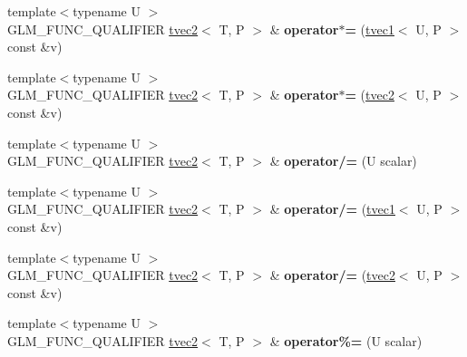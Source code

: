 \begin{DoxyCompactItemize}
\item 
\hypertarget{structglm_1_1tvec2_aacddba2473d9bb1871b30b33dd214bec}{{\footnotesize template$<$typename U $>$ }\\G\-L\-M\-\_\-\-F\-U\-N\-C\-\_\-\-Q\-U\-A\-L\-I\-F\-I\-E\-R \hyperlink{structglm_1_1tvec2}{tvec2}$<$ T, P $>$ \& {\bfseries operator$\ast$=} (\hyperlink{structglm_1_1tvec1}{tvec1}$<$ U, P $>$ const \&v)}\label{structglm_1_1tvec2_aacddba2473d9bb1871b30b33dd214bec}

\item 
\hypertarget{structglm_1_1tvec2_a993842ad4e15e45284bd39b7ceaa7dd3}{{\footnotesize template$<$typename U $>$ }\\G\-L\-M\-\_\-\-F\-U\-N\-C\-\_\-\-Q\-U\-A\-L\-I\-F\-I\-E\-R \hyperlink{structglm_1_1tvec2}{tvec2}$<$ T, P $>$ \& {\bfseries operator$\ast$=} (\hyperlink{structglm_1_1tvec2}{tvec2}$<$ U, P $>$ const \&v)}\label{structglm_1_1tvec2_a993842ad4e15e45284bd39b7ceaa7dd3}

\item 
\hypertarget{structglm_1_1tvec2_a50542837f7d732334ecf178403a4100b}{{\footnotesize template$<$typename U $>$ }\\G\-L\-M\-\_\-\-F\-U\-N\-C\-\_\-\-Q\-U\-A\-L\-I\-F\-I\-E\-R \hyperlink{structglm_1_1tvec2}{tvec2}$<$ T, P $>$ \& {\bfseries operator/=} (U scalar)}\label{structglm_1_1tvec2_a50542837f7d732334ecf178403a4100b}

\item 
\hypertarget{structglm_1_1tvec2_a19b74b0db17121ccf51b68fc25e579a2}{{\footnotesize template$<$typename U $>$ }\\G\-L\-M\-\_\-\-F\-U\-N\-C\-\_\-\-Q\-U\-A\-L\-I\-F\-I\-E\-R \hyperlink{structglm_1_1tvec2}{tvec2}$<$ T, P $>$ \& {\bfseries operator/=} (\hyperlink{structglm_1_1tvec1}{tvec1}$<$ U, P $>$ const \&v)}\label{structglm_1_1tvec2_a19b74b0db17121ccf51b68fc25e579a2}

\item 
\hypertarget{structglm_1_1tvec2_a572fa5d63392fd44f7bbdd35cbed43ca}{{\footnotesize template$<$typename U $>$ }\\G\-L\-M\-\_\-\-F\-U\-N\-C\-\_\-\-Q\-U\-A\-L\-I\-F\-I\-E\-R \hyperlink{structglm_1_1tvec2}{tvec2}$<$ T, P $>$ \& {\bfseries operator/=} (\hyperlink{structglm_1_1tvec2}{tvec2}$<$ U, P $>$ const \&v)}\label{structglm_1_1tvec2_a572fa5d63392fd44f7bbdd35cbed43ca}

\item 
\hypertarget{structglm_1_1tvec2_ab4ffac9c9fc45f4156d271accb5920a7}{{\footnotesize template$<$typename U $>$ }\\G\-L\-M\-\_\-\-F\-U\-N\-C\-\_\-\-Q\-U\-A\-L\-I\-F\-I\-E\-R \hyperlink{structglm_1_1tvec2}{tvec2}$<$ T, P $>$ \& {\bfseries operator\%=} (U scalar)}\label{structglm_1_1tvec2_ab4ffac9c9fc45f4156d271accb5920a7}


\end{DoxyCompactItemize}
